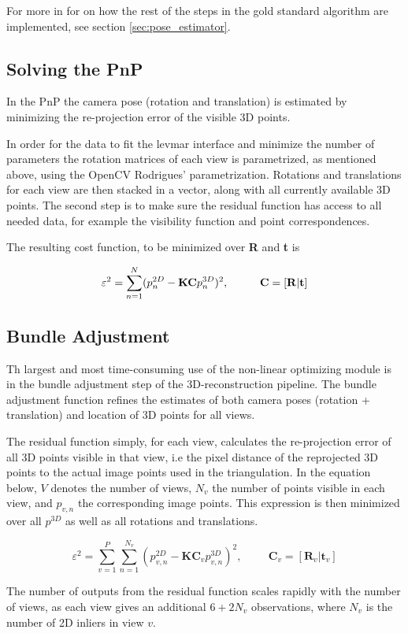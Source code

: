 For more in for on how the rest of the steps in the gold standard algorithm are implemented, see section \ref{sec:pose_estimator}.
\newpage

\subsection{Solving the PnP}
In the PnP the camera pose (rotation and translation) is estimated by minimizing the re-projection error of the visible 3D points.

In order for the data to fit the levmar interface and minimize the number of parameters the rotation matrices of each view is parametrized, as mentioned above, using the OpenCV Rodrigues' parametrization. Rotations and translations for each view are then stacked in a vector, along with all currently available 3D points. The second step is to make sure the residual function has access to all needed data, for example the visibility function and point correspondences.

The resulting cost function, to be minimized over \textbf{R} and \textbf{t} is

\begin{equation}
\label{eq:PnP}
\varepsilon^2 = \sum_{n=1}^{N} (p_n^{2D} - \textbf{KC}p_{n}^{3D})^2, \hspace{1cm} \textbf{C} = [\bf{R} | \bf{t}]
\end{equation} 

\subsection{Bundle Adjustment}
Th largest and most time-consuming use of the non-linear optimizing module is in the bundle adjustment step of the 3D-reconstruction pipeline. The bundle adjustment function refines the estimates of both camera poses (rotation + translation) and location of 3D points for all views. 

The residual function simply, for each view, calculates the re-projection error of all 3D points visible in that view, i.e the pixel distance of the reprojected 3D points to the actual image points used in the triangulation. In the equation below, $V$ denotes the number of views, $N_v$ the number of points visible in each view, and $p_{v,n}$ the corresponding image points. This expression is then minimized over all $p^{3D}$ as well as all rotations and translations. 

\begin{equation}
\label{eq:BA}
\varepsilon^2 = \sum_{v=1}^{P}\sum_{n=1}^{N_v} (p_{v,n}^{2D} - \textbf{KC}_vp_{v,n}^{3D})^2, \hspace{1cm} \textbf{C}_v = [\textbf{R}_v | \textbf{t}_v]
\end{equation} 


The number of outputs from the residual function scales rapidly with the number of views, as each view gives an additional $ 6 + 2N_v $ observations, where $ N_v $ is the number of 2D inliers in view $v$.





